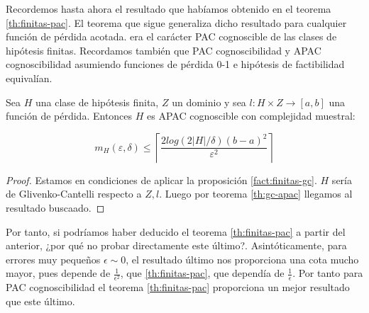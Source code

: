 Recordemos hasta ahora el resultado que habíamos obtenido en el teorema \ref{th:finitas-pac}. El 
teorema que sigue generaliza dicho resultado para cualquier función de pérdida acotada.
era el carácter PAC cognoscible de las clases de hipótesis finitas. Recordamos también que 
PAC cognoscibilidad y APAC cognoscibilidad asumiendo funciones de pérdida 0-1 e hipótesis de 
factibilidad equivalían.

\begin{theorem}

Sea $H$ una clase de hipótesis finita, $Z$ un dominio y sea $l : H \times Z \rightarrow [a,b]$ una
función de pérdida. Entonces $H$ es APAC cognoscible con complejidad muestral:

\[m_{H}( \varepsilon, \delta ) \le \left\lceil \frac{2 log(2|H|/\delta)(b-a)^2}{\varepsilon^2} \right\rceil\]

\label{finitas-apac}
\end{theorem}
  
  \begin{proof}
  Estamos en condiciones de aplicar la proposición \ref{fact:finitas-gc}. $H$ sería de Glivenko-Cantelli 
  respecto a $Z,l$. Luego por teorema \ref{th:gc-apac} llegamos al resultado buscaado.
  \end{proof}

Por tanto, si podríamos haber deducido el teorema \ref{th:finitas-pac} a partir del anterior, ¿por qué no probar
directamente este último?. Asintóticamente, para errores muy pequeños $\epsilon \sim 0$, el resultado último nos 
proporciona una cota mucho mayor, pues depende de $\frac{1}{\epsilon^2}$, que \ref{th:finitas-pac}, que dependía 
de $\frac{1}{\epsilon}$. Por tanto para PAC cognoscibilidad el teorema \ref{th:finitas-pac} proporciona un mejor
resultado que este último.